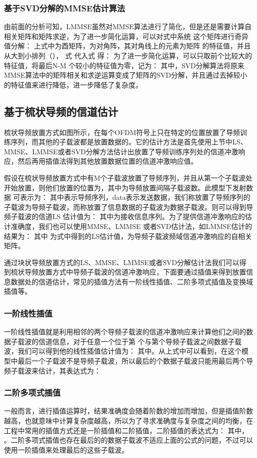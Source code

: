 \subsubsection{基于SVD分解的MMSE估计算法}
由前面的分析可知，LMMSE虽然对MMSE算法进行了简化，但是还是需要计算自相关矩阵和矩阵求逆，为了进一步简化运算，可以对式中系统 这个矩阵进行奇异值分解：
上式中为酉矩阵，为对角阵，其对角线上的元素为矩阵 的特征值，并且从大到小排列（）， 式 代入式 得：
为了进一步简化运算，可以只取前个比较大的特征值，将最后N-M 个较小的特征值为零，记为：
其中，SVD分解算法将原来MMSE算法中的矩阵相关和求逆运算变成了矩阵的SVD分解，并且通过去掉较小的特征值来进行降低，进一步降低了复杂度。
\subsection{基于梳状导频的信道估计}
梳状导频放置方式如图所示，在每个OFDM符号上只在特定的位置放置了导频训练序列，而其他的子载波都是放置数据的。它的估计方法是首先使用上节中LS、MMSE、LMMSE或者SVD分解方法估计出放置了导频训练序列处的信道冲激响应，然后再用插值法得到其他放置数据位置的信道冲激响应值。

假设在梳状导频放置方式中有M个子载波放置了导频序列，并且从第一个子载波处开始放置，则他们放置的位置为，其中为导频放置间隔子载波数。此模型下发射数据 可表示为：
其中表示导频序列，data表示发送数据，我们称放置了导频序列的子载波为导频子载波，而称放置了信息数据的子载波为数据子载波。则可以得到导频子载波的信道LS 估计值为：
其中为接收信息序列。为了提供信道冲激响应的估计准确度，我们也可以使用MMSE、LMMSE 或者SVD估计法，如LMMSE估计的结果为：
其中 为式中得到的LS估计值，为导频子载波频域信道冲激响应的自相关矩阵。

通过块状导频放置方式的LS、MMSE、LMMSE或者SVD分解估计法我们可以得到梳状导频放置方式中导频子载波的信道冲激响应，下面要通过插值来得到放置信息数据处的信道估计，常见的插值方法有一阶线性插值、二阶多项式插值及变换域插值等。
\subsubsection{一阶线性插值}
一阶线性插值就是利用相邻的两个导频子载波的信道冲激响应来计算他们之间的数据子载波的信道信息，对于任意一个位于第 个与第个导频子载波之间数据子载波，我们可以得到他的线性插值估计值为\cite{sandell1996comparative}：
其中。从上式中可以看到，在这个模型中最后一个子载波不是导频子载波，所以最后的个数据子载波只能用最后两个导频子载波来估计，其表达式为：
\subsubsection{二阶多项式插值}
一般而言，进行插值运算时，结果准确度会随着阶数的增加而增加\cite{garcia2000pilot}，但是插值阶数越高，也就意味中计算复杂度越高，所以为了寻求准确度与复杂度之间的均衡，在工程中常用的插值方式还是一阶插值和二阶插值，二阶插值的表达式为：
其中，
。二阶多项式插值也存在最后的的数据子载波不适应上面的公式的问题，不过可以使用一阶插值来处理最后的这些子载波。
